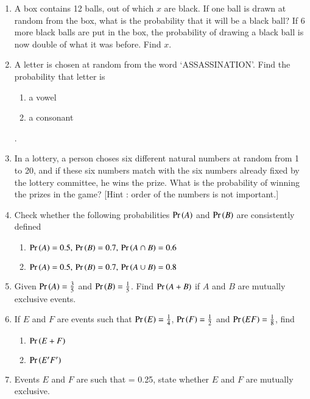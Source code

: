 \begin{enumerate}[label=\thesection.\arabic*,ref=\thesection.\theenumi]
\solution

\item A box contains 12 balls, out of which $x$ are black. If one ball is drawn at random from the box, what is the probability that it will be a black ball? If 6 more black balls are put in the box, the probability of drawing a black ball is now double of what it was before. Find $x$.\\
\solution

\item A letter is chosen at random from the word ‘ASSASSINATION’. Find the probability that letter is
\begin{enumerate}
  \item  a vowel 
   \item    a consonant 
\end{enumerate}.
\solution

\item In a lottery, a person choses six different natural numbers at random from 1 to 20, and if these six numbers match with the six numbers already fixed by the lottery committee, he wins  the prize. What is the probability of winning the prizes in the game? [Hint : order of the numbers is not important.]
	\\
\solution

%
\item Check whether the following probabilities $\Pr\left(A\right)$ and $\Pr\left(B\right)$ are consistently defined
\begin{enumerate}
\item $\Pr\left(A\right) = 0.5,\, \Pr\left(B\right) = 0.7,\, \Pr\left(A \cap B\right) = 0.6$
\item $\Pr\left(A\right) = 0.5,\, \Pr\left(B\right) = 0.7,\, \Pr\left(A \cup B\right) = 0.8$
\end{enumerate}
\solution

\item Given $\Pr\left(A\right)=\frac{3}{5}$ and $\Pr\left(B\right)=\frac{1}{5}$. Find $\Pr\left(A+B\right)$ if $A$ and $B$ are mutually exclusive events.\\
\solution

\item If $E$ and $F$ are events such that $\Pr\left(E\right)=\frac{1}{4}$, $\Pr\left(F\right)= \frac{1}{2}$ and $\Pr\left(EF\right) =\frac{1}{8}$, find
\begin{enumerate}
\item $\Pr\left(E + F\right)$
\item $\Pr\left(E^\prime F^\prime\right)$
\end{enumerate}
\solution

\item Events $E$ and $F$ are such that  = 0.25, state whether $E$ and $F$ are mutually exclusive.\\

\end{enumerate}
